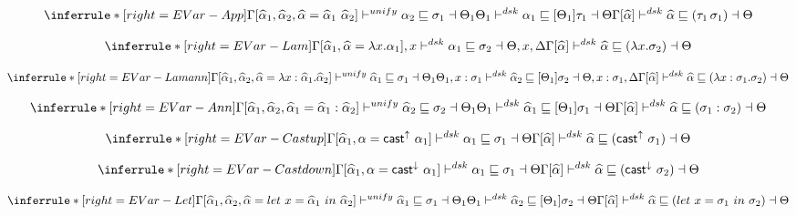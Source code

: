\[
\inferrule*[right=EVar-App]
{
\Gamma[\widehat \alpha_1, \widehat \alpha_2, \widehat \alpha = \widehat \alpha_1~\widehat \alpha_2]
    \unify \alpha_2 \sqsubseteq \sigma_1 \dashv \Theta_1 \\
\Theta_1 \dsk \alpha_1 \sqsubseteq [\Theta_1]\tau_1 \dashv \Theta
}
{\Gamma[\widehat \alpha]\dsk \widehat \alpha \sqsubseteq (\tau_1\, \sigma_1) \dashv \Theta}
\]

\[
\inferrule*[right=EVar-Lam]
{
\Gamma[\widehat \alpha_1, \widehat \alpha = \lambda x. \alpha_1], x \dsk \alpha_1 \sqsubseteq \sigma_2 \dashv \Theta, x, \Delta}
{\Gamma[\widehat \alpha] \dsk \widehat \alpha \sqsubseteq (\lambda x. \sigma_2) \dashv \Theta }
\]


\[
\inferrule*[right=EVar-Lamann]
{
\Gamma[\widehat \alpha_1, \widehat \alpha_2, \widehat \alpha = \lambda x:\widehat \alpha_1. \widehat \alpha_2]
\unify \widehat \alpha_1 \sqsubseteq \sigma_1 \dashv \Theta_1 \\
\Theta_1, x:\sigma_1 \dsk \widehat \alpha_2 \sqsubseteq [\Theta_1]\sigma_2 \dashv \Theta, x:\sigma_1, \Delta }
{\Gamma[\widehat \alpha]\dsk \widehat \alpha \sqsubseteq (\lambda x:\sigma_1. \sigma_2) \dashv \Theta
}
\]

\[
\inferrule*[right=EVar-Ann]
{
\Gamma[\widehat \alpha_1, \widehat \alpha_2, \widehat \alpha_1 = \widehat \alpha_1:\widehat \alpha_2]
\unify \widehat \alpha_2 \sqsubseteq \sigma_2 \dashv \Theta_1 \\
\Theta_1 \dsk \widehat \alpha_1 \sqsubseteq [\Theta_1]\sigma_1 \dashv \Theta }
{\Gamma[\widehat \alpha] \dsk \widehat \alpha \sqsubseteq (\sigma_1:\sigma_2) \dashv \Theta}
\]

\[
\inferrule*[right=EVar-Castup]
{
\Gamma[\widehat \alpha_1, \alpha = \castupe \alpha_1] \dsk  \alpha_1 \sqsubseteq \sigma_1 \dashv \Theta}
{\Gamma[\widehat \alpha] \dsk  \widehat \alpha \sqsubseteq  (\castupe \sigma_1) \dashv \Theta}
\]

\[
\inferrule*[right=EVar-Castdown]
{
\Gamma[\widehat \alpha_1, \alpha = \castdowne \alpha_1] \dsk  \alpha_1 \sqsubseteq \sigma_1 \dashv \Theta}
{\Gamma[\widehat \alpha] \dsk  \widehat \alpha \sqsubseteq  (\castdowne \sigma_2) \dashv \Theta}
\]

\[
\inferrule*[right=EVar-Let]
{
\Gamma[\widehat \alpha_1, \widehat \alpha_2, \widehat \alpha = let~x=\widehat \alpha_1~in~\widehat \alpha_2]
\unify \widehat \alpha_1 \sqsubseteq \sigma_1 \dashv \Theta_1 \\
\Theta_1 \dsk \widehat \alpha_2 \sqsubseteq [\Theta_1]\sigma_2 \dashv \Theta }
{\Gamma[\widehat \alpha] \dsk \widehat \alpha  \sqsubseteq  (let\ x = \sigma_1\ in\ \sigma_2) \dashv \Theta }
\]

